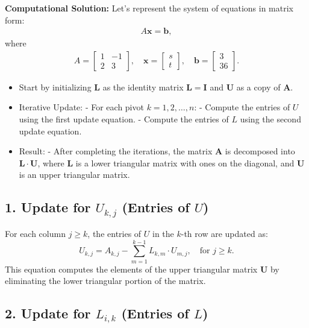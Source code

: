 \documentclass[journal]{IEEEtran}
\begin{document}
\textbf{Computational Solution:}
\newline
Let's represent the system of equations in matrix form:
\begin{align}
    A \mathbf{x} = \mathbf{b},
\end{align}
where
\begin{align}
    A = \begin{bmatrix} 1 & -1 \\ 2 & 3 \end{bmatrix}, \quad
    \mathbf{x} = \begin{bmatrix} s \\ t \end{bmatrix}, \quad
    \mathbf{b} = \begin{bmatrix} 3 \\ 36 \end{bmatrix}.
\end{align}
\begin{itemize}
\item Start by initializing $ \mathbf{L} $ as the identity matrix $ \mathbf{L} = \mathbf{I} $ and $ \mathbf{U} $ as a copy of $ \mathbf{A} $.\\
\item Iterative Update:
   - For each pivot $ k = 1, 2, \ldots, n $:
     - Compute the entries of $ U $ using the first update equation.
     - Compute the entries of $ L $ using the second update equation.\\   
\item Result:
   - After completing the iterations, the matrix $ \mathbf{A} $ is decomposed into $ \mathbf{L} \cdot \mathbf{U} $, where $ \mathbf{L} $ is a lower triangular matrix with ones on the diagonal, and $ \mathbf{U} $ is an upper triangular matrix.
\end{itemize}
    

\subsection*{1. Update for $ U_{k,j} $ (Entries of $ U $)}

For each column $ j \geq k $, the entries of $ U $ in the $ k $-th row are updated as:
\[
U_{k,j} = A_{k,j} - \sum_{m=1}^{k-1} L_{k,m} \cdot U_{m,j}, \quad \text{for } j \geq k.
\]
This equation computes the elements of the upper triangular matrix $ \mathbf{U} $ by eliminating the lower triangular portion of the matrix.

\subsection*{2. Update for $ L_{i,k} $ (Entries of $ L $)}
\end{document}
